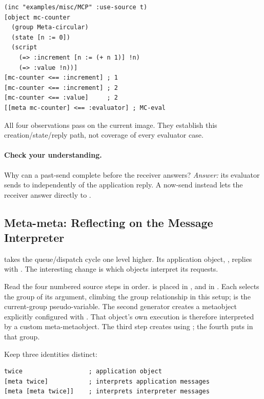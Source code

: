 \begin{lstlisting}
(inc "examples/misc/MCP" :use-source t)
[object mc-counter
  (group Meta-circular)
  (state [n := 0])
  (script
    (=> :increment [n := (+ n 1)] !n)
    (=> :value !n))]
[mc-counter <== :increment] ; 1
[mc-counter <== :increment] ; 2
[mc-counter <== :value]     ; 2
[[meta mc-counter] <== :evaluator] ; MC-eval
\end{lstlisting}

All four observations pass on the current image. They establish this
creation/state/reply path, not coverage of every evaluator case.

\paragraph{Check your understanding.}
Why can a past-send complete before the receiver answers?
\emph{Answer:} its evaluator sends  to  independently
of the application reply. A now-send instead lets the receiver answer
directly to .

\subsection{Meta-meta: Reflecting on the Message Interpreter}
\label{sec:meta-meta-reading}

 takes the queue/dispatch
cycle one level higher. Its application object, ,
replies with . The interesting change is which objects
interpret its requests.

Read the four numbered source steps in order.
 is placed in
, and  in
. Each  selects the group of
its argument, climbing the group relationship in this setup;
 is the current-group pseudo-variable.
The second generator creates a metaobject explicitly configured with
. That object's own execution
is therefore interpreted by a custom meta-metaobject.
The third step creates  using ;
the fourth puts  in that group.

Keep three identities distinct:

\begin{lstlisting}
twice                  ; application object
[meta twice]           ; interprets application messages
[meta [meta twice]]    ; interprets interpreter messages
\end{lstlisting}


